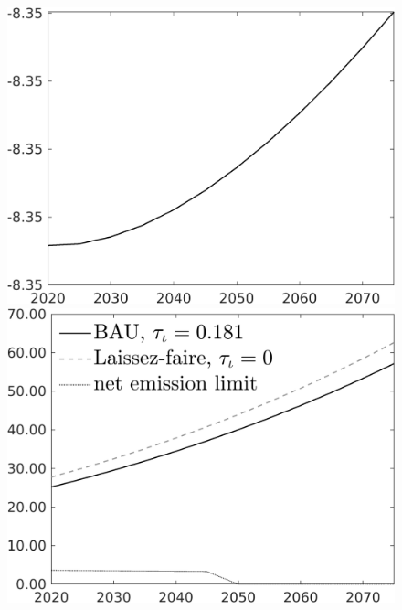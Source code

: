 \documentclass[12pt]{article}
\begin{document}
\begin{figure}[h!!]
\begin{minipage}[]{0.32\textwidth}
	\end{minipage}	
	\begin{minipage}[]{0.32\textwidth}
		\includegraphics[width=1\textwidth]{../../codding_model/own_basedOnFried/optimalPol_010922_revision/figures/all_13Sept22/CompTaul_LFBAUPer_Reg0_C_spillover0_nsk0_xgr0_knspil0_sep1_countec0_GovRev0_etaa0.79.png}
	\end{minipage}	
	\begin{minipage}[]{0.32\textwidth}
		\includegraphics[width=1\textwidth]{../../codding_model/own_basedOnFried/optimalPol_010922_revision/figures/all_13Sept22/CompTaul_LFBAU_Reg0_Emnet_spillover0_nsk0_xgr0_knspil0_sep1_countec0_GovRev0_etaa0.79_lgd1.png}

\end{minipage}
\end{figure}
\end{document}
